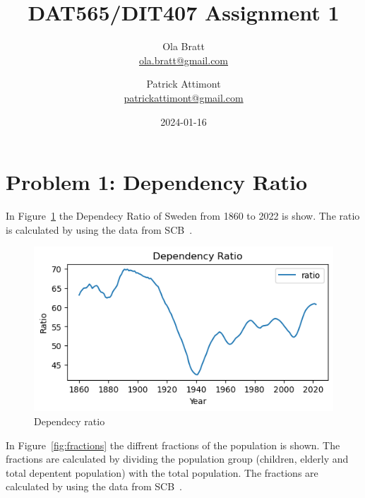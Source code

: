 \documentclass[a4paper]{article}
\begin{document}
\author{Ola Bratt \\
  \href{mailto:ola.bratt@gmail.com}{ola.bratt@gmail.com}
  \and
  Patrick Attimont \\
  \href{patrickattimont@gmail.com}{patrickattimont@gmail.com}
}

\title{DAT565/DIT407 Assignment 1}
\date{2024-01-16}

\maketitle



\section*{Problem 1: Dependency Ratio}

In Figure~\ref{fig:ratio} the Dependecy Ratio of Sweden from 1860 to 2022 is show.
The ratio is calculated by using the data from SCB~\cite{SCB:2023}.



\begin{figure}[h]
  \begin{center}
    \includegraphics[width=\textwidth]{ratio.png}
    \caption{Dependecy ratio}
    \label{fig:ratio}
  \end{center}
\end{figure}

\newpage

In Figure~\ref{fig:fractions} the diffrent fractions of the population is shown. The fractions 
are calculated by dividing the population group (children, elderly and total depentent population) with the total population. 
The fractions are calculated by using the data from SCB~\cite{SCB:2023}.
\end{document}
